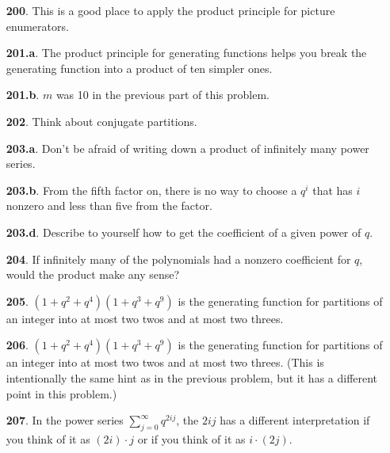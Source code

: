 \documentclass[10pt,]{book}
\theoremstyle{plain}
\theoremstyle{definition}
\theoremstyle{definition}
\numberwithin{equation}{chapter}
\begin{document}
\begin{itemize}[itemsep=1em]
\item[\textbf{200}.]\hypertarget{p-1139}{}%
This is a good place to apply the product principle for picture enumerators.%

\item[\textbf{201.a}.]\hypertarget{p-1145}{}%
The product principle for generating functions helps you break the generating function into a product of ten simpler ones.%

\item[\textbf{201.b}.]\hypertarget{p-1148}{}%
\(m\) was 10 in the previous part of this problem.%

\item[\textbf{202}.]\hypertarget{p-1151}{}%
Think about conjugate partitions.%

\item[\textbf{203.a}.]\hypertarget{p-1155}{}%
Don't be afraid of writing down a product of infinitely many power series.%

\item[\textbf{203.b}.]\hypertarget{p-1158}{}%
From the fifth factor on, there is no way to choose a \(q^i\) that has \(i\) nonzero and less than five from the factor.%

\item[\textbf{203.d}.]\hypertarget{p-1163}{}%
Describe to yourself how to get the coefficient of a given power of \(q\).%

\item[\textbf{204}.]\hypertarget{p-1169}{}%
If infinitely many of the polynomials had a nonzero coefficient for \(q\), would the product make any sense?%

\item[\textbf{205}.]\hypertarget{p-1172}{}%
\((1 + q^2 + q^4 )(1 + q^3 + q^9 )\) is the generating function for partitions of an integer into at most two twos and at most two threes.%

\item[\textbf{206}.]\hypertarget{p-1175}{}%
\((1 + q^2 + q^4 )(1 + q^3 + q^9 )\) is the generating function for partitions of an integer into at most two twos and at most two threes. (This is intentionally the same hint as in the previous problem, but it has a different point in this problem.)%

\item[\textbf{207}.]\hypertarget{p-1178}{}%
In the power series \(\sum_{j=0}^\infty q^{2ij}\), the \(2ij\) has a different interpretation if you think of it as \((2i) \cdot j\) or if you think of it as \(i \cdot (2j)\).%


\end{itemize}
\end{document}
